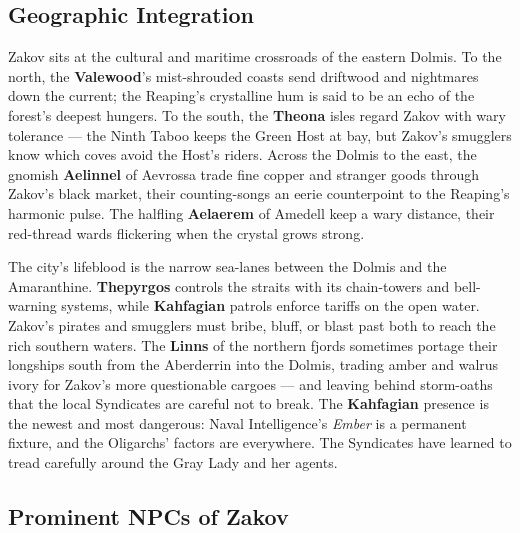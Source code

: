 \documentclass[12pt,oneside]{book}
\begin{document}
\subsection*{Geographic Integration}

Zakov sits at the cultural and maritime crossroads of the eastern Dolmis. To the north, the \textbf{Valewood}'s mist-shrouded coasts send driftwood and nightmares down the current; the Reaping's crystalline hum is said to be an echo of the forest's deepest hungers. To the south, the \textbf{Theona} isles regard Zakov with wary tolerance --- the Ninth Taboo keeps the Green Host at bay, but Zakov's smugglers know which coves avoid the Host's riders. Across the Dolmis to the east, the gnomish \textbf{Aelinnel} of Aevrossa trade fine copper and stranger goods through Zakov's black market, their counting-songs an eerie counterpoint to the Reaping's harmonic pulse. The halfling \textbf{Aelaerem} of Amedell keep a wary distance, their red-thread wards flickering when the crystal grows strong.

The city's lifeblood is the narrow sea-lanes between the Dolmis and the Amaranthine. \textbf{Thepyrgos} controls the straits with its chain-towers and bell-warning systems, while \textbf{Kahfagian} patrols enforce tariffs on the open water. Zakov's pirates and smugglers must bribe, bluff, or blast past both to reach the rich southern waters. The \textbf{Linns} of the northern fjords sometimes portage their longships south from the Aberderrin into the Dolmis, trading amber and walrus ivory for Zakov's more questionable cargoes --- and leaving behind storm-oaths that the local Syndicates are careful not to break. The \textbf{Kahfagian} presence is the newest and most dangerous: Naval Intelligence's \textit{Ember} is a permanent fixture, and the Oligarchs' factors are everywhere. The Syndicates have learned to tread carefully around the Gray Lady and her agents.

\subsection*{Prominent NPCs of Zakov}
\label{sec:zakov-npcs}
\end{document}
